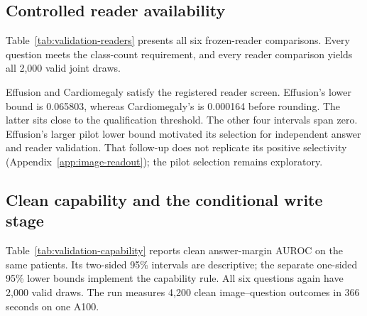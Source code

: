 \subsection{Controlled reader availability}

Table~\ref{tab:validation-readers} presents all six frozen-reader comparisons.
Every question meets the class-count requirement, and every reader
comparison yields all 2,000 valid joint draws.

\begin{table}[H]
\centering
\caption{Frozen clinical-reader qualification on validation patients.}
\label{tab:validation-readers}
\end{table}

Effusion and Cardiomegaly satisfy the registered reader screen. Effusion's
lower bound is 0.065803, whereas Cardiomegaly's is 0.000164 before rounding.
The latter sits close to the qualification threshold. The other four
intervals span zero. Effusion's larger pilot lower bound motivated its
selection for independent answer and reader validation. That follow-up
does not replicate its positive selectivity (Appendix~\ref{app:image-readout});
the pilot selection remains exploratory.

\clearpage
\subsection{Clean capability and the conditional write stage}

Table~\ref{tab:validation-capability} reports clean answer-margin AUROC on
the same patients. Its two-sided 95\% intervals are descriptive; the
separate one-sided 95\% lower bounds implement the capability rule. All six
questions again have 2,000 valid draws. The run measures 4,200 clean
image--question outcomes in 366 seconds on one A100.

